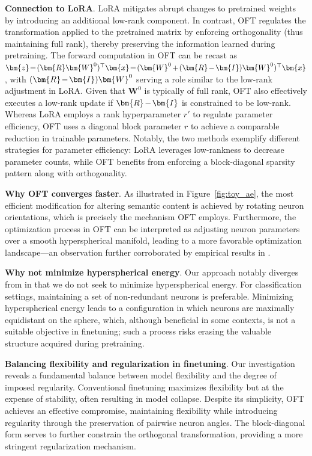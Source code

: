 \textbf{Connection to LoRA}. LoRA mitigates abrupt changes to pretrained weights by introducing an additional low-rank component. In contrast, OFT regulates the transformation applied to the pretrained matrix by enforcing orthogonality (thus maintaining full rank), thereby preserving the information learned during pretraining. The forward computation in OFT can be recast as $\thickmuskip=2mu \medmuskip=2mu \bm{z}=(\bm{R}\bm{W}^0)^\top\bm{x}=(\bm{W}^0+(\bm{R}-\bm{I})\bm{W}^0)^\top\bm{x}$, with $\thickmuskip=2mu \medmuskip=2mu (\bm{R}-\bm{I})\bm{W}^0$ serving a role similar to the low-rank adjustment in LoRA. Given that $\bm{W}^0$ is typically of full rank, OFT also effectively executes a low-rank update if $\thickmuskip=2mu \medmuskip=2mu \bm{R}-\bm{I}$ is constrained to be low-rank. Whereas LoRA employs a rank hyperparameter $r'$ to regulate parameter efficiency, OFT uses a diagonal block parameter $r$ to achieve a comparable reduction in trainable parameters. Notably, the two methods exemplify different strategies for parameter efficiency: LoRA leverages low-rankness to decrease parameter counts, while OFT benefits from enforcing a block-diagonal sparsity pattern along with orthogonality.

\textbf{Why OFT converges faster}. As illustrated in Figure~\ref{fig:toy_ae}, the most efficient modification for altering semantic content is achieved by rotating neuron orientations, which is precisely the mechanism OFT employs. Furthermore, the optimization process in OFT can be interpreted as adjusting neuron parameters over a smooth hyperspherical manifold, leading to a more favorable optimization landscape—an observation further corroborated by empirical results in \cite{liu2021orthogonal}.

\textbf{Why not minimize hyperspherical energy}. Our approach notably diverges from \cite{liu2021orthogonal} in that we do not seek to minimize hyperspherical energy. For classification settings, maintaining a set of non-redundant neurons is preferable. Minimizing hyperspherical energy leads to a configuration in which neurons are maximally equidistant on the sphere, which, although beneficial in some contexts, is not a suitable objective in finetuning; such a process risks erasing the valuable structure acquired during pretraining.

\textbf{Balancing flexibility and regularization in finetuning}. Our investigation reveals a fundamental balance between model flexibility and the degree of imposed regularity. Conventional finetuning maximizes flexibility but at the expense of stability, often resulting in model collapse. Despite its simplicity, OFT achieves an effective compromise, maintaining flexibility while introducing regularity through the preservation of pairwise neuron angles. The block-diagonal form serves to further constrain the orthogonal transformation, providing a more stringent regularization mechanism.

